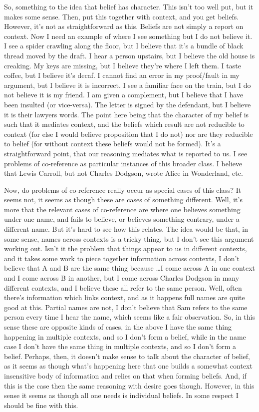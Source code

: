 \documentclass[10pt]{article}
\begin{document}
So, something to the idea that belief has character.
This isn't too well put, but it makes some sense.
Then, put this together with context, and you get beliefs.
However, it's not as straightforward as this.
Beliefs are not simply a report on context.
Now I need an example of where I see something but I do not believe it.
I see a spider crawling along the floor, but I believe that it's a bundle of black thread moved by the draft.
I hear a person upstairs, but I believe the old house is creaking.
My keys are missing, but I believe they're where I left them.
I taste coffee, but I believe it's decaf.
I cannot find an error in my proof/fault in my argument, but I believe it is incorrect.
I see a familiar face on the train, but I do not believe it is my friend.
I am given a complement, but I believe that I have been insulted (or vice-versa).
The letter is signed by the defendant, but I believe it is their lawyers words.
The point here being that the character of my belief is such that it mediates context, and the beliefs which result are not reducible to context (for else I would believe proposition that I do not) nor are they reducible to belief (for without context these beliefs would not be formed).
It's a straightforward point, that our reasoning mediates what is reported to us.
I see problems of co-reference as particular instances of this broader class.
I believe that Lewis Carroll, but not Charles Dodgson, wrote Alice in Wonderland, etc.


{\color{red} Now, do problems of co-reference really occur as special cases of this class?
  It seems not, it seems as though these are cases of something different.
  Well, it's more that the relevant cases of co-reference are where one believes something under one name, and fails to believe, or believes something contrary, under a different name.
  But it's hard to see how this relates.
  The idea would be that, in some sense, names across contexts is a tricky thing, but I don't see this argument working out.
  Isn't it the problem that things appear to us in different contexts, and it takes some work to piece together information across contexts, I don't believe that A and B are the same thing because \dots I come across A in one context and I come across B in another, but I come across Charles Dodgson in many different contexts, and I believe these all refer to the same person.
  Well, often there's information which links context, and as it happens full names are quite good at this.
  Partial names are not, I don't believe that Sam refers to the same person every time I hear the name, which seems like a fair observation.
  So, in this sense these are opposite kinds of cases, in the above I have the same thing happening in multiple contexts, and so I don't form a belief, while in the name case I don't have the same thing in multiple contexts, and so I don't form a belief.
  Perhaps, then, it doesn't make sense to talk about the character of belief, as it seems as though what's happening here that one builds a somewhat context insensitive body of information and relies on that when forming beliefs.
  And, if this is the case then the same reasoning with desire goes though.
  However, in this sense it seems as though all one needs is individual beliefs.
  In some respect I should be fine with this.
}
\end{document}
